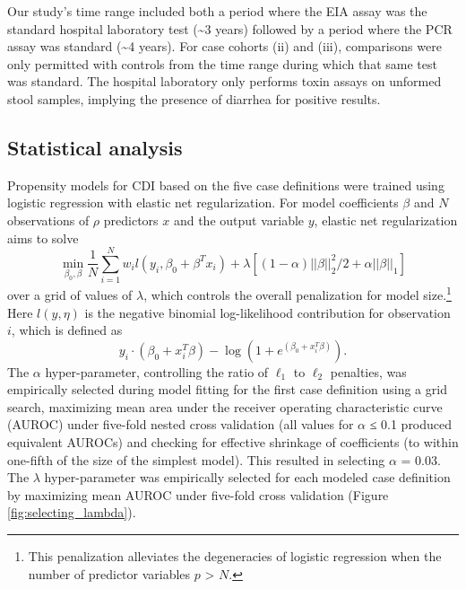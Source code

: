 Our study’s time range included both a period where the EIA assay was the standard hospital laboratory test (\textasciitilde{}3 years) followed by a period where the PCR assay was standard (\textasciitilde{}4 years). For case cohorts (ii) and (iii), comparisons were only permitted with controls from the time range during which that same test was standard. The hospital laboratory only performs toxin assays on unformed stool samples, implying the presence of diarrhea for positive results.

\subsection{Statistical analysis}

Propensity models for CDI based on the five case definitions were trained using logistic regression with elastic net regularization. For model coefficients $\beta$ and $N$ observations of $\rho$ predictors $x$ and the output variable $y$, elastic net regularization aims to solve $$\min_{\beta_0,\beta} \frac{1}{N} \sum_{i=1}^{N} w_i l(y_i,\beta_0+\beta^T x_i) + \lambda\left[(1-\alpha)||\beta||_2^2/2 + \alpha ||\beta||_1\right]$$ over a grid of values of $\lambda$, which controls the overall penalization for model size.\footnote{This penalization alleviates the degeneracies of logistic regression when the number of predictor variables $p$ > $N$.} Here $l(y,\eta)$ is the negative binomial log-likelihood contribution for observation $i$, which is defined as $$y_i \cdot (\beta_0 + x_i^T \beta) - \log (1+e^{(\beta_0+x_i^T \beta)}).$$ The $\alpha$ hyper-parameter, controlling the ratio of $\ell_1$ to $\ell_2$ penalties, was empirically selected during model fitting for the first case definition using a grid search, maximizing mean area under the receiver operating characteristic curve (AUROC) under five-fold nested cross validation (all values for $\alpha$ ≤ 0.1 produced equivalent AUROCs) and checking for effective shrinkage of coefficients (to within one-fifth of the size of the simplest model). This resulted in selecting $\alpha$ = 0.03. The $\lambda$ hyper-parameter was empirically selected for each modeled case definition by maximizing mean AUROC under five-fold cross validation (Figure \ref{fig:selecting_lambda}).
